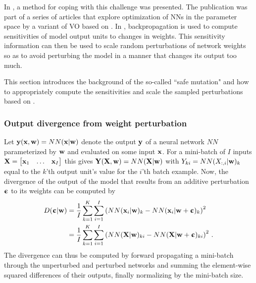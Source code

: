 In \cite{Lehman2017a}, a method for coping with this challenge was presented. The publication was part of a series of articles \cite{Lehman2017, Conti2017, Zhang2017, Such2017} that explore optimization of \glspl{NN} in the parameter space by a variant of \gls{VO} based on \cite{Salimans2017}. 
In \cite{Lehman2017a}, backpropagation is used to compute sensitivities of model output units to changes in weights. This sensitivity information can then be used to scale random perturbations of network weights so as to avoid perturbing the model in a manner that changes its output too much.

This section introduces the background of the so-called ``safe mutation" and how to appropriately compute the sensitivities and scale the sampled perturbations based on \cite{Lehman2017a}.


\subsubsection{Output divergence from weight perturbation}
Let ${\mathbf{y}}({\mathbf{x}},{\mathbf{w}})=NN({\mathbf{x}}|{\mathbf{w}})$ denote the output ${\mathbf{y}}$ of a neural network $NN$ parameterized by ${\mathbf{w}}$ and evaluated on some input ${\mathbf{x}}$. For a mini-batch of $I$ inputs ${\mathbf{X}}={\begin{bmatrix}{\mathbf{x}}_1&\dots&{\mathbf{x}}_I\end{bmatrix}}$ this gives ${\mathbf{Y}}({\mathbf{X}},{\mathbf{w}})=NN({\mathbf{X}}|{\mathbf{w}})$ with $Y_{ki}=NN(X_{:,i}|{\mathbf{w}})_k$ equal to the $k$'th output unit's value for the $i$'th batch example. 
Now, the divergence of the output of the model that results from an additive perturbation ${\boldsymbol{\upepsilon}}$ to its weights can be computed by 
\begin{align}
    D({\boldsymbol{\upepsilon}}|{\mathbf{w}}) &=
    \frac{1}{I}\sum_{k=1}^K\sum_{i=1}^I {\left(NN({\mathbf{x}}_i|{\mathbf{w}})_k - NN({\mathbf{x}}_i|{\mathbf{w}}+{\boldsymbol{\upepsilon}})_k\right)}^2\\
    &=
    \frac{1}{I}\sum_{k=1}^K\sum_{i=1}^I {\left(NN({\mathbf{X}}|{\mathbf{w}})_{ki} - NN({\mathbf{X}}|{\mathbf{w}}+{\boldsymbol{\upepsilon}})_{ki}\right)}^2 \ .
    \label{eq: Theory: Variational Optimization - Safe mutation divergence definition}
\end{align}
The divergence can thus be computed by forward propagating a mini-batch through the unperturbed and perturbed networks and summing the element-wise squared differences of their outputs, finally normalizing by the mini-batch size.




